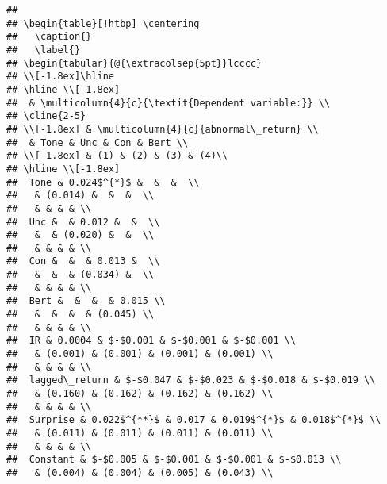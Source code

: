 \documentclass[
]{article}
\begin{document}
\begin{verbatim}
## 
## \begin{table}[!htbp] \centering 
##   \caption{} 
##   \label{} 
## \begin{tabular}{@{\extracolsep{5pt}}lcccc} 
## \\[-1.8ex]\hline 
## \hline \\[-1.8ex] 
##  & \multicolumn{4}{c}{\textit{Dependent variable:}} \\ 
## \cline{2-5} 
## \\[-1.8ex] & \multicolumn{4}{c}{abnormal\_return} \\ 
##  & Tone & Unc & Con & Bert \\ 
## \\[-1.8ex] & (1) & (2) & (3) & (4)\\ 
## \hline \\[-1.8ex] 
##  Tone & 0.024$^{*}$ &  &  &  \\ 
##   & (0.014) &  &  &  \\ 
##   & & & & \\ 
##  Unc &  & 0.012 &  &  \\ 
##   &  & (0.020) &  &  \\ 
##   & & & & \\ 
##  Con &  &  & 0.013 &  \\ 
##   &  &  & (0.034) &  \\ 
##   & & & & \\ 
##  Bert &  &  &  & 0.015 \\ 
##   &  &  &  & (0.045) \\ 
##   & & & & \\ 
##  IR & 0.0004 & $-$0.001 & $-$0.001 & $-$0.001 \\ 
##   & (0.001) & (0.001) & (0.001) & (0.001) \\ 
##   & & & & \\ 
##  lagged\_return & $-$0.047 & $-$0.023 & $-$0.018 & $-$0.019 \\ 
##   & (0.160) & (0.162) & (0.162) & (0.162) \\ 
##   & & & & \\ 
##  Surprise & 0.022$^{**}$ & 0.017 & 0.019$^{*}$ & 0.018$^{*}$ \\ 
##   & (0.011) & (0.011) & (0.011) & (0.011) \\ 
##   & & & & \\ 
##  Constant & $-$0.005 & $-$0.001 & $-$0.001 & $-$0.013 \\ 
##   & (0.004) & (0.004) & (0.005) & (0.043) \\ 

\end{verbatim}
\end{document}
